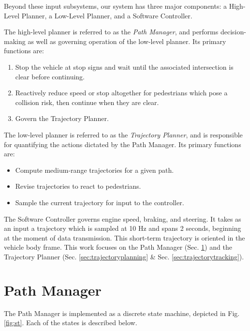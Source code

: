 \documentclass[letterpaper, 10 pt, conference]{ieeeconf}  %
\begin{document}
Beyond these input subsystems, our system has three major components: a High-Level Planner, a Low-Level Planner, and a Software Controller.

The high-level planner is referred to as the {\it Path Manager}, and performs decision-making as well as governing operation of the low-level planner.
Its primary functions are:
\begin{enumerate}
  \item Stop the vehicle at stop signs and wait until the associated intersection is clear before continuing.
  \item Reactively reduce speed or stop altogether for pedestrians which pose a collision risk, then continue when they are clear.
  \item Govern the Trajectory Planner.
\end{enumerate}
The low-level planner is referred to as the {\it Trajectory Planner}, and is responsible for quantifying the actions dictated by the Path Manager.
Its primary functions are:
\begin{itemize}
  \item Compute medium-range trajectories for a given path.
  \item Revise trajectories to react to pedestrians.
  \item Sample the current trajectory for input to the controller.
\end{itemize}

The Software Controller governs engine speed, braking, and steering.
It takes as an input a trajectory which is sampled at 10 Hz and spans 2 seconds, beginning at the moment of data transmission.
This short-term trajectory is oriented in the vehicle body frame.
This work focuses on the Path Manager (Sec. \ref{sec:pathmanager}) and the Trajectory Planner (Sec. \ref{sec:trajectoryplanning} \& Sec. \ref{sec:trajectorytracking}).



\section{Path Manager} \label{sec:pathmanager}

The Path Manager is implemented as a discrete state machine, depicted in Fig. \ref{fig:st}.
Each of the states is described below.
\end{document}
